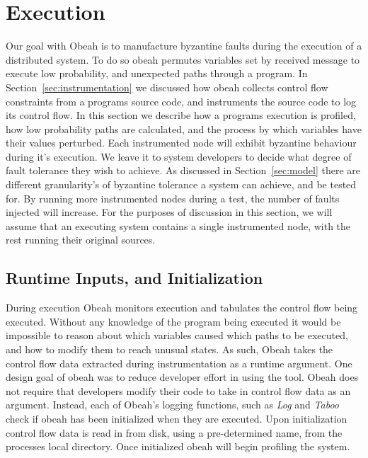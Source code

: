 \section{Execution}
\label{sec:execution}

Our goal with Obeah is to manufacture byzantine faults during the execution of
a distributed system. To do so obeah permutes variables set by received message
to execute low probability, and unexpected paths through a program. In
Section~\ref{sec:instrumentation} we discussed how obeah collects control flow
constraints from a programs source code, and instruments the source code to log
its control flow. In this section we describe how a programs execution is
profiled, how low probability paths are calculated, and the process by which
variables have their values perturbed.  Each instrumented node will exhibit
byzantine behaviour during it's execution. We leave it to system developers to
decide what degree of fault tolerance they wish to achieve. As discussed in
Section~\ref{sec:model} there are different granularity's of byzantine
tolerance a system can achieve, and be tested for. By running more instrumented
nodes during a test, the number of faults injected will increase.  For the
purposes of discussion in this section, we will assume that an executing system
contains a single instrumented node, with the rest running their original
sources.

\subsection{Runtime Inputs, and Initialization}

During execution Obeah monitors execution and tabulates the control flow being
executed. Without any knowledge of the program being executed it would be
impossible to reason about which variables caused which paths to be executed,
and how to modify them to reach unusual states. As such, Obeah takes the control
flow data extracted during instrumentation as a runtime argument. One design
goal of obeah was to reduce developer effort in using the tool. Obeah does not
require that developers modify their code to take in control flow data as an
argument. Instead, each of Obeah's logging functions, such as \emph{Log} and
\emph{Taboo} check if obeah has been initialized when they are executed. Upon
initialization control flow data is read in from disk, using a pre-determined
name, from the processes local directory. Once initialized obeah will begin
profiling the system.

